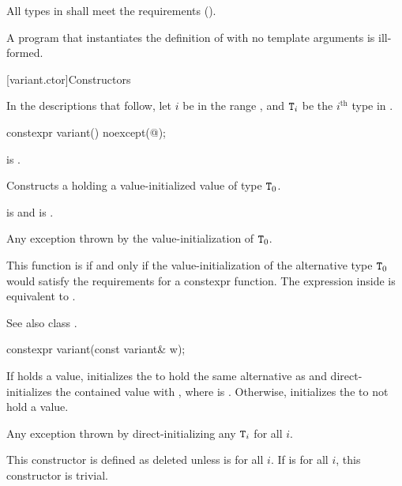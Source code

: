 \pnum
All types in  shall meet
the  requirements ().

\pnum
A program that instantiates the definition of  with
no template arguments is ill-formed.

[variant.ctor]{Constructors}

\pnum
In the descriptions that follow, let $i$ be in the range ,
and $\texttt{T}_i$ be the $i^\text{th}$ type in .

%
\begin{itemdecl}
constexpr variant() noexcept(@\seebelow@);
\end{itemdecl}

\begin{itemdescr}
\pnum
\constraints
{} is .

\pnum
\effects
Constructs a  holding a value-initialized value of type $\texttt{T}_0$.

\pnum
\ensures
{} is  and  is .

\pnum
\throws
Any exception thrown by the value-initialization of $\texttt{T}_0$.

\pnum
\remarks
This function is  if and only if the
value-initialization of the alternative type $\texttt{T}_0$ would satisfy the
requirements for a constexpr function.
The expression inside  is equivalent to
.
\begin{note}
See also class .
\end{note}
\end{itemdescr}

%
\begin{itemdecl}
constexpr variant(const variant& w);
\end{itemdecl}

\begin{itemdescr}
\pnum
\effects
If  holds a value, initializes the  to hold the same
alternative as  and direct-initializes the contained value
with , where  is .
Otherwise, initializes the  to not hold a value.

\pnum
\throws
Any exception thrown by direct-initializing any $\texttt{T}_i$ for all $i$.

\pnum
\remarks
This constructor is defined as deleted unless
 is  for all $i$.
If 
is  for all $i$, this constructor is trivial.
\end{itemdescr}

